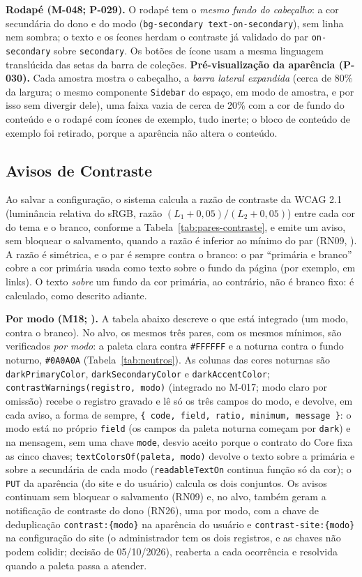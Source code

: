 \textbf{Rodapé (M-048; P-029).} O rodapé tem o \emph{mesmo fundo do cabeçalho}: a cor secundária do dono e do modo (\texttt{bg-secondary text-on-secondary}), sem linha nem sombra; o texto e os ícones herdam o contraste já validado do par \texttt{on-secondary} sobre \texttt{secondary}. Os botões de ícone usam a mesma linguagem translúcida das setas da barra de coleções. \textbf{Pré-visualização da aparência (P-030).} Cada amostra mostra o cabeçalho, a \emph{barra lateral expandida} (cerca de 80\% da largura; o mesmo componente \texttt{Sidebar} do espaço, em modo de amostra, e por isso sem divergir dele), uma faixa vazia de cerca de 20\% com a cor de fundo do conteúdo e o rodapé com ícones de exemplo, tudo inerte; o bloco de conteúdo de exemplo foi retirado, porque a aparência não altera o conteúdo.

\subsection{Avisos de Contraste}\label{sec:arq-contraste}

Ao salvar a configuração, o sistema calcula a razão de contraste da WCAG 2.1 (luminância relativa do sRGB, razão $(L_1 + 0{,}05)/(L_2 + 0{,}05)$) entre cada cor do tema e o branco, conforme a Tabela~\ref{tab:pares-contraste}, e emite um aviso, sem bloquear o salvamento, quando a razão é inferior ao mínimo do par (RN09, ). A razão é simétrica, e o par é sempre contra o branco: o par ``primária e branco'' cobre a cor primária usada como texto sobre o fundo da página (por exemplo, em links). O texto \emph{sobre} um fundo da cor primária, ao contrário, não é branco fixo: é calculado, como descrito adiante.

\textbf{Por modo (M18; ).} A tabela abaixo descreve o que está integrado (um modo, contra o branco). No alvo, os mesmos três pares, com os mesmos mínimos, são verificados \emph{por modo}: a paleta clara contra \texttt{\#FFFFFF} e a noturna contra o fundo noturno, \texttt{\#0A0A0A} (Tabela~\ref{tab:neutros}). As colunas das cores noturnas são \texttt{darkPrimaryColor}, \texttt{darkSecondaryColor} e \texttt{darkAccentColor}; \texttt{contrastWarnings(registro, modo)} (integrado no M-017; modo claro por omissão) recebe o registro gravado e lê só os três campos do modo, e devolve, em cada aviso, a forma de sempre, \texttt{\{ code, field, ratio, minimum, message \}}: o modo está no próprio \texttt{field} (os campos da paleta noturna começam por \texttt{dark}) e na mensagem, sem uma chave \texttt{mode}, desvio aceito porque o contrato do Core fixa as cinco chaves; \texttt{textColorsOf(paleta, modo)} devolve o texto sobre a primária e sobre a secundária de cada modo (\texttt{readableTextOn} continua função só da cor); o \texttt{PUT} da aparência (do site e do usuário) calcula os dois conjuntos. Os avisos continuam sem bloquear o salvamento (RN09) e, no alvo, também geram a notificação de contraste do dono (RN26), uma por modo, com a chave de deduplicação \texttt{contrast:\{modo\}} na aparência do usuário e \texttt{contrast-site:\{modo\}} na configuração do site (o administrador tem os dois registros, e as chaves não podem colidir; decisão de 05/10/2026), reaberta a cada ocorrência e resolvida quando a paleta passa a atender.

